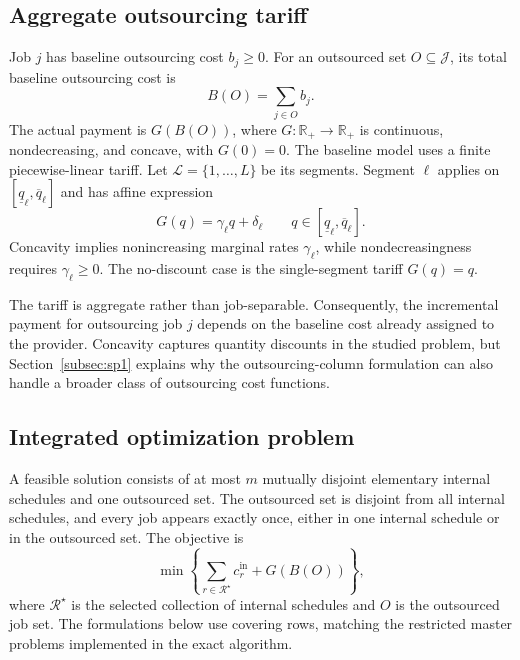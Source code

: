 \subsection{Aggregate outsourcing tariff}

Job $j$ has baseline outsourcing cost $b_j\ge0$. For an outsourced set
$O\subseteq\mathcal J$, its total baseline outsourcing cost is
\begin{equation}
    B(O)=\sum_{j\in O}b_j.
    \label{eq:baseline-outsourcing-cost}
\end{equation}
The actual payment is $G(B(O))$, where $G:\mathbb R_+\rightarrow\mathbb R_+$ is
continuous, nondecreasing, and concave, with $G(0)=0$. The baseline model uses a
finite piecewise-linear tariff. Let $\mathcal L=\{1,\ldots,L\}$ be its segments.
Segment $\ell$ applies on
$[\underline q_\ell,\overline q_\ell]$ and has affine expression
\begin{equation}
    G(q)=\gamma_\ell q+\delta_\ell
    \qquad
    q\in[\underline q_\ell,\overline q_\ell].
    \label{eq:outsourcing-tariff-segment}
\end{equation}
Concavity implies nonincreasing marginal rates $\gamma_\ell$, while
nondecreasingness requires $\gamma_\ell\ge0$. The no-discount case is the
single-segment tariff $G(q)=q$.

The tariff is aggregate rather than job-separable. Consequently, the incremental
payment for outsourcing job $j$ depends on the baseline cost already assigned to
the provider. Concavity captures quantity discounts in the studied problem, but
Section~\ref{subsec:sp1} explains why the outsourcing-column formulation can also
handle a broader class of outsourcing cost functions.

\subsection{Integrated optimization problem}

A feasible solution consists of at most $m$ mutually disjoint elementary internal
schedules and one outsourced set. The outsourced set is disjoint from all internal
schedules, and every job appears exactly once, either in one internal schedule or
in the outsourced set. The objective is
\begin{equation}
    \min
    \left\{
        \sum_{r\in\mathcal R^\star}c_r^{\mathrm{in}}
        +
        G(B(O))
    \right\},
    \label{eq:original-problem}
\end{equation}
where $\mathcal R^\star$ is the selected collection of internal schedules and
$O$ is the outsourced job set. The formulations below use covering rows, matching
the restricted master problems implemented in the exact algorithm.
